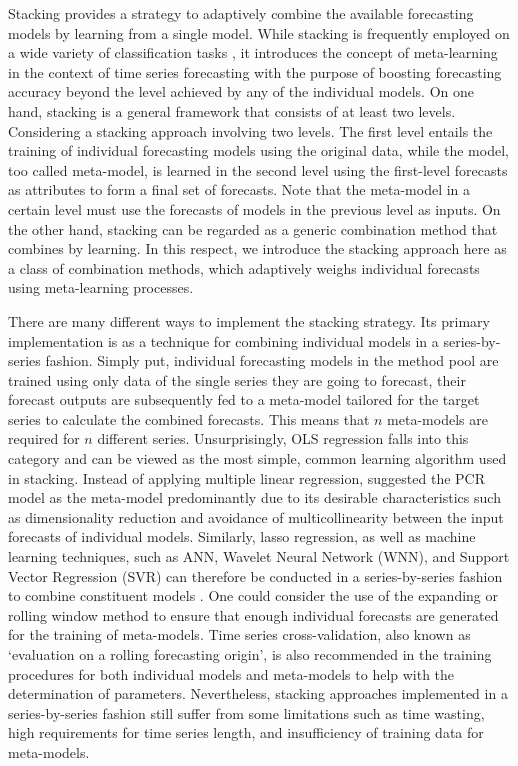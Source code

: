 \documentclass[11pt]{article}
\begin{document}
Stacking \citep[stacked generalization,][]{Wolpert1992-if} provides a strategy to adaptively combine the available forecasting models by learning from a single model. While stacking is frequently employed on a wide variety of classification tasks \citep{Zhou2012-cy}, it introduces the concept of meta-learning in the context of time series forecasting with the purpose of boosting forecasting accuracy beyond the level achieved by any of the individual models. On one hand, stacking is a general framework that consists of at least two levels. Considering a stacking approach involving two levels. The first level entails the training of individual forecasting models using the original data, while the model, too called meta-model, is learned in the second level using the first-level forecasts as attributes to form a final set of forecasts. Note that the meta-model in a certain level must use the forecasts of models in the previous level as inputs. On the other hand, stacking can be regarded as a generic combination method that combines by learning. In this respect, we introduce the stacking approach here as a class of combination methods, which adaptively weighs individual forecasts using meta-learning processes.

There are many different ways to implement the stacking strategy. Its primary implementation is as a technique for combining individual models in a series-by-series fashion. Simply put, individual forecasting models in the method pool are trained using only data of the single series they are going to forecast, their forecast outputs are subsequently fed to a meta-model tailored for the target series to calculate the combined forecasts. This means that $n$ meta-models are required for $n$ different series. Unsurprisingly, OLS regression \citep[e.g.,][]{Granger1984-jc,Gunter1992-go} falls into this category and can be viewed as the most simple, common learning algorithm used in stacking. Instead of applying multiple linear regression, \cite{Moon2020-ls} suggested the PCR model as the meta-model predominantly due to its desirable characteristics such as dimensionality reduction and avoidance of multicollinearity between the input forecasts of individual models. Similarly, lasso regression, as well as machine learning techniques, such as ANN, Wavelet Neural Network (WNN), and Support Vector Regression (SVR) can therefore be conducted in a series-by-series fashion to combine constituent models \citep[e.g.,][]{Donaldson1996-um,Conflitti2015-fq,Ribeiro2019-wk,Ribeiro2020-mj}. One could consider the use of the expanding or rolling window method to ensure that enough individual forecasts are generated for the training of meta-models. Time series cross-validation, also known as `evaluation on a rolling forecasting origin', is also recommended in the training procedures for both individual models and meta-models to help with the determination of parameters. Nevertheless, stacking approaches implemented in a series-by-series fashion still suffer from some limitations such as time wasting, high requirements for time series length, and insufficiency of training data for meta-models.
\end{document}
